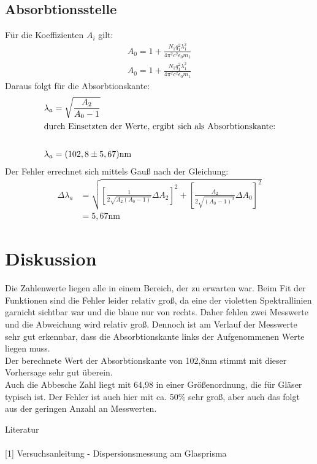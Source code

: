 \subsection{Absorbtionsstelle}
Für die Koeffizienten $A_i$ gilt:
\begin{align*}
A_0=1+\frac{N_1q^2_1\lambda^2_1}{4\pi^2c^2\epsilon_0m_1}\\
A_0=1+\frac{N_1q^2_1\lambda^2_1}{4\pi^2c^2\epsilon_0m_1}
\end{align*}
Daraus folgt für die Absorbtionskante:
\begin{align*}
\lambda_a&=\sqrt{\frac{A_2}{A_0-1}}\\
\intertext{durch Einsetzten der Werte, ergibt sich als Absorbtionskante:}\\
\lambda_a&=(102,8 \pm 5,67)\text{nm}
\end{align*}
Der Fehler errechnet sich mittels Gauß nach der Gleichung:
\begin{align*}
\Delta \lambda_a &= \sqrt{\left[\frac{1}{2\sqrt{A_2(A_0-1)}}\Delta A_2\right]^2+\left[\frac{A_2}{2\sqrt{(A_0-1)^3}}\Delta A_0\right]^2}\\
&=5,67 \text{nm}
\end{align*}
\section{Diskussion}
Die Zahlenwerte liegen alle in einem Bereich, der zu erwarten war. Beim Fit der Funktionen sind die Fehler leider relativ groß, da eine der violetten Spektrallinien garnicht sichtbar war und die blaue nur von rechts. Daher fehlen zwei Messwerte und die Abweichung wird relativ groß. Dennoch ist am Verlauf der Messwerte sehr gut erkennbar, dass die Absorbtionskante links der Aufgenommenen Werte liegen muss.\\
Der berechnete Wert der Absorbtionskante von 102,8nm stimmt mit dieser Vorhersage sehr gut überein.\\
Auch die Abbesche Zahl liegt mit 64,98 in einer Größenordnung, die für Gläser typisch ist. Der Fehler ist auch hier mit ca. 50\% sehr groß, aber auch das folgt aus der geringen Anzahl an Messwerten. 



\parskip 200pt
\Large{Literatur}\\\\
\large{[1] Versuchsanleitung - Dispersionsmessung am Glasprisma}\\\\

